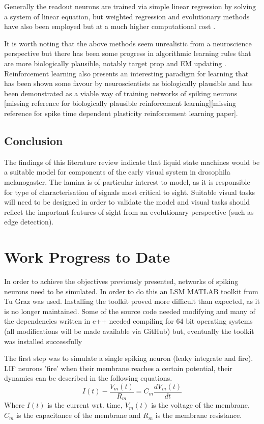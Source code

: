 \documentclass[fleqn,12pt]{wlscirep}
\begin{document}
Generally the readout neurons are trained via simple linear regression by solving a system of linear equation, but weighted regression and evolutionary methods have also been employed but at a much higher computational cost \cite{lukosevicius_reservoir_2009}.

It is worth noting that the above methods seem unrealistic from a neuroscience perspective but there has been some progress in algorithmic learning rules that are more biologically plausible, notably target prop and EM updating \cite{bengio_towards_2015}. Reinforcement learning also presents an interesting paradigm for learning that has been shown some favour by neuroscientists as biologically plausible and has been demonstrated as a viable way of training networks of spiking neurons [missing reference for biologically plausible reinforcement learning][missing reference for spike time dependent plasticity reinforcement learning paper].

\subsection*{Conclusion}
The findings of this literature review indicate that liquid state machines would be a suitable model for components of the early visual system in drosophila melanogaster. The lamina is of particular interest to model, as it is responsible for type of characterisation of signals most critical to sight. Suitable visual tasks will need to be designed in order to validate the model and visual tasks should reflect the important features of sight from an evolutionary perspective (such as edge detection).



\section*{Work Progress to Date}
In order to achieve the objectives previously presented, networks of spiking neurons need to be simulated. In order to do this an LSM MATLAB toolkit from Tu Graz was used. Installing the toolkit proved more difficult than expected, as it is no longer maintained. Some of the source code needed modifying and many of the dependencies written in c++ needed compiling for 64 bit operating systems (all modifications will be made available via GitHub) but, eventually the toolkit was installed successfully

The first step was to simulate a single spiking neuron (leaky integrate and fire). LIF neurons 'fire' when their membrane reaches a certain potential, their dynamics can be described in the following equations. 
$$I(t) - \frac{V_m(t)}{R_m} = C_m \frac{dV_m(t)}{dt}$$ 
Where $I(t)$ is the current wrt. time, $V_m(t)$ is the voltage of the membrane, $C_m$ is the capacitance of the membrane and $R_m$ is the membrane resistance.
\end{document}

